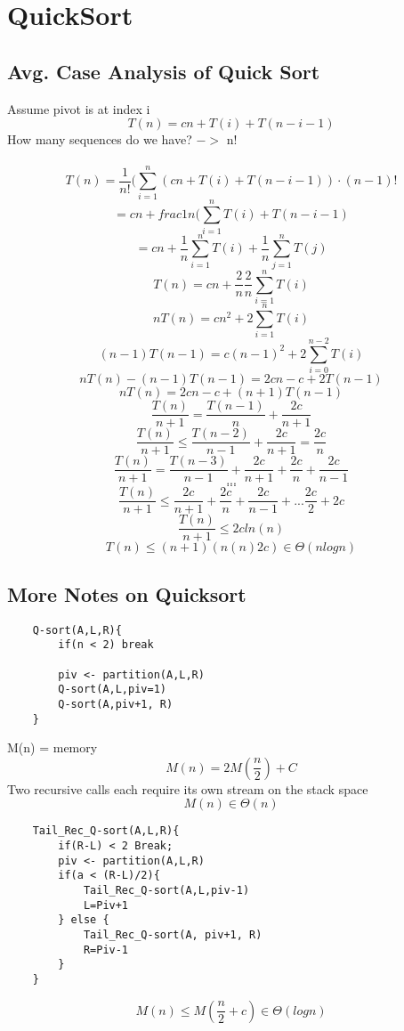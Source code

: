 \documentclass[12pt]{article}
\begin{document}
	\section*{QuickSort}
	
	\subsection*{Avg. Case Analysis of Quick Sort}
	Assume pivot is at index i\\
	$$T(n) = cn + T(i) + T(n-i - 1)$$
	How many sequences do we have? $->$ n!\\\
	$$T(n) = \frac{1}{n!}(\sum_{i=1}^{n}(cn + T(i) + T(n-i-1)) \cdot (n-1)!$$
	$$= cn + frac{1}{n}(\sum_{i=1}^{n}T(i) + T(n-i-1)$$
	$$= cn + \frac{1}{n}\sum_{i=1}^{n}T(i) + \frac{1}{n}\sum_{j=1}^{n}T(j)$$
	$$T(n) = cn + \frac{2}{n}\frac{2}{n}\sum_{i=1}^{n}T(i)$$
	$$nT(n) = cn^2 + 2 \sum_{i=1}^{n}T(i)$$
	$$(n-1)T(n-1) = c(n-1)^2 + 2\sum_{i=0}^{n-2}T(i)$$
	$$nT(n) - (n-1)T(n-1) = 2cn - c + 2T(n-1)$$
	$$nT(n) = 2cn - c + (n+1)T(n-1)$$
	$$\frac{T(n)}{n+1} = \frac{T(n-1)}{n} + \frac{2c}{n+1}$$
	$$\frac{T(n)}{n+1} \leq \frac{T(n-2)}{n-1} + \frac{2c}{n+1} = \frac{2c}{n}$$
	$$\frac{T(n)}{n+1} = \frac{T(n-3)}{n-1} + \frac{2c}{n+1} + \frac{2c}{n} + \frac{2c}{n-1}$$
	$$...$$
	$$...$$
	$$\frac{T(n)}{n+1} \leq \frac{2c}{n+1} + \frac{2c}{n} + \frac{2c}{n-1} + ... \frac{2c}{2} + 2c$$
	$$\frac{T(n)}{n+1} \leq 2cln(n)$$
	$$T(n) \leq (n+1)(n(n) 2c) \in \Theta(nlogn)$$
	
	\subsection*{More Notes on Quicksort}
	\begin{verbatim}
	Q-sort(A,L,R){
		if(n < 2) break
		
		piv <- partition(A,L,R)
		Q-sort(A,L,piv=1)
		Q-sort(A,piv+1, R)
	}
	\end{verbatim}
	M(n) = memory\\
	$$M(n) = 2M(\frac{n}{2}) + C$$
	Two recursive calls each require its own stream on the stack space\\
	$$M(n) \in \Theta(n)$$
	
	\begin{verbatim}
	Tail_Rec_Q-sort(A,L,R){
		if(R-L) < 2 Break;
		piv <- partition(A,L,R)
		if(a < (R-L)/2){
			Tail_Rec_Q-sort(A,L,piv-1)
			L=Piv+1
		} else {
			Tail_Rec_Q-sort(A, piv+1, R)
			R=Piv-1
		}
	}
	\end{verbatim}
	
	$$M(n) \leq M(\frac{n}{2} + c) \in \Theta(logn)$$
	
\end{document}

